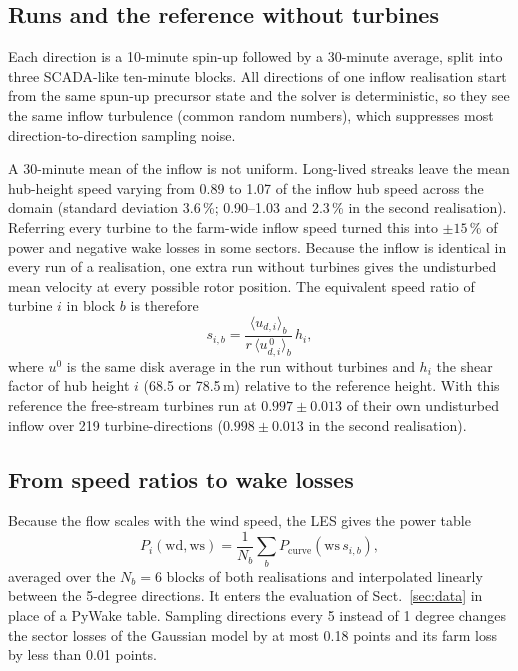 \documentclass[11pt,a4paper]{article}
\begin{document}
\subsection{Runs and the reference without turbines}

Each direction is a 10-minute spin-up followed by a 30-minute average, split into three SCADA-like ten-minute
blocks. All directions of one inflow realisation start from the same spun-up precursor state and the solver is
deterministic, so they see the same inflow turbulence (common random numbers), which suppresses most
direction-to-direction sampling noise.

A 30-minute mean of the inflow is not uniform. Long-lived streaks leave the mean hub-height speed varying from
0.89 to 1.07 of the inflow hub speed across the domain (standard deviation 3.6\,\%; 0.90--1.03 and 2.3\,\% in the
second realisation). Referring every turbine to the farm-wide inflow speed turned this into $\pm 15$\,\% of power
and negative wake losses in some sectors. Because the inflow is identical in every run of a realisation, one
extra run without turbines gives the undisturbed mean velocity at every possible rotor position. The equivalent
speed ratio of turbine $i$ in block $b$ is therefore
\begin{equation}
  s_{i,b} = \frac{\langle u_{d,i} \rangle_b}{r\, \langle u_{d,i}^{\,0} \rangle_b}\, h_i ,
\end{equation}
where $u^{0}$ is the same disk average in the run without turbines and $h_i$ the shear factor of hub height
$i$ (68.5 or 78.5\,m) relative to the reference height. With this reference the free-stream turbines run at
$0.997 \pm 0.013$ of their own undisturbed inflow over 219 turbine-directions ($0.998 \pm 0.013$ in the second
realisation).

\subsection{From speed ratios to wake losses}

Because the flow scales with the wind speed, the LES gives the power table
\begin{equation}
  P_i(\mathrm{wd}, \mathrm{ws}) = \frac{1}{N_b}\sum_{b} P_{\mathrm{curve}}(\mathrm{ws}\, s_{i,b}) ,
\end{equation}
averaged over the $N_b = 6$ blocks of both realisations and interpolated linearly between the 5-degree
directions. It enters the evaluation of Sect.~\ref{sec:data} in place of a PyWake table. Sampling directions every
5 instead of 1 degree changes the sector losses of the Gaussian model by at most 0.18 points and its farm loss by
less than 0.01 points.
\end{document}
